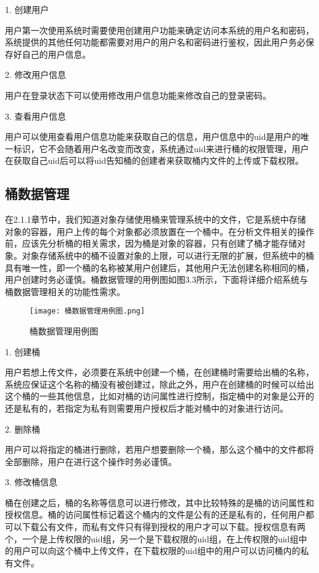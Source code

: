 1. 创建用户

用户第一次使用系统时需要使用创建用户功能来确定访问本系统的用户名和密码，系统提供的其他任何功能都需要对用户的用户名和密码进行鉴权，因此用户务必保存好自己的用户信息。

2. 修改用户信息

用户在登录状态下可以使用修改用户信息功能来修改自己的登录密码。

3. 查看用户信息

用户可以使用查看用户信息功能来获取自己的信息，用户信息中的uid是用户的唯一标识，它不会随着用户名改变而改变，系统通过uid来进行桶的权限管理，用户在获取自己uid后可以将uid告知桶的创建者来获取桶内文件的上传或下载权限。

\subsection{桶数据管理}
在2.1.1章节中，我们知道对象存储使用桶来管理系统中的文件，它是系统中存储对象的容器，用户上传的每个对象都必须放置在一个桶中。在分析文件相关的操作前，应该先分析桶的相关需求，因为桶是对象的容器，只有创建了桶才能存储对象。对象存储系统中的桶不设置对象的上限，可以进行无限的扩展，但系统中的桶具有唯一性，即一个桶的名称被某用户创建后，其他用户无法创建名称相同的桶，用户创建时务必谨慎。桶数据管理的用例图如图3.3所示，下面将详细介绍系统与桶数据管理相关的功能性需求。

\begin{figure}[h]
    \centering
    \texttt{[image: 桶数据管理用例图.png]}
    \caption{桶数据管理用例图}
\end{figure}

1. 创建桶

用户若想上传文件，必须要在系统中创建一个桶，在创建桶时需要给出桶的名称，系统应保证这个名称的桶没有被创建过，除此之外，用户在创建桶的时候可以给出这个桶的一些其他信息，比如对桶的访问属性进行控制，指定桶中的对象是公开的还是私有的，若指定为私有则需要用户授权后才能对桶中的对象进行访问。

2. 删除桶

用户可以将指定的桶进行删除，若用户想要删除一个桶，那么这个桶中的文件都将全部删除，用户在进行这个操作时务必谨慎。

3. 修改桶信息

桶在创建之后，桶的名称等信息可以进行修改，其中比较特殊的是桶的访问属性和授权信息。桶的访问属性标记着这个桶内的文件是公有的还是私有的，任何用户都可以下载公有文件，而私有文件只有得到授权的用户才可以下载。授权信息有两个，一个是上传权限的uid组，另一个是下载权限的uid组，在上传权限的uid组中的用户可以向这个桶中上传文件，在下载权限的uid组中的用户可以访问桶内的私有文件。

